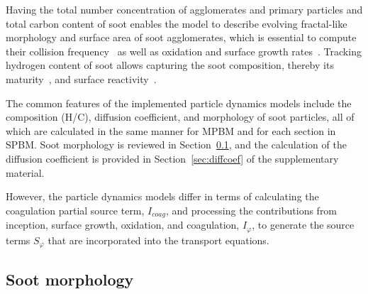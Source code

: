 Having the total number concentration of agglomerates and primary particles and total carbon content of soot enables the model to describe evolving fractal-like morphology and surface area of soot agglomerates, which is essential to compute their collision frequency~\citep{mulholland1988cluster} as well as oxidation and surface growth rates~\citep{kelesidis2019estimating}. Tracking hydrogen content of soot allows capturing the soot composition, thereby its maturity~\citep{kholghy2016core}, and surface reactivity~\citep{blanquart2009analyzing}.

The common features of the implemented particle dynamics models include the composition (H/C), diffusion coefficient, and morphology of soot particles, all of which are calculated in the same manner for MPBM and for each section in SPBM. Soot morphology is reviewed in Section~\ref{sec:sootmorphology}, and the calculation of the diffusion coefficient is provided in Section~\ref{sec:diffcoef} of the supplementary material. 

However, the particle dynamics models differ in terms of calculating the coagulation partial source term, $I_{coag}$, and processing the contributions from inception, surface growth, oxidation, and coagulation, $I_{\varphi}$, to generate the source terms $S_{\varphi}$ that are incorporated into the transport equations.



\subsection{Soot morphology}
\label{sec:sootmorphology}

